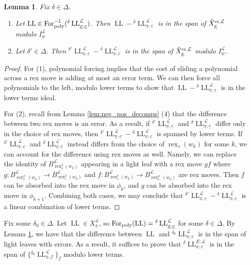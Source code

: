 \documentclass{amsart}
\newcommand{\scrL}{\mathcal{L}}
\DeclareMathOperator{\For}{For}
\DeclareMathOperator{\rex}{rex}
\DeclareMathOperator{\LL}{LL}
\newcommand{\ue}{\underline{e}}
\newcommand{\uf}{\underline{f}}
\newcommand{\uw}{\underline{w}}
\newcommand{\ux}{\underline{x}}
\newtheorem{lemma}[subsubsection]{Lemma}
\theoremstyle{definition}
\numberwithin{equation}{subsection}
\begin{document}
\begin{lemma}\label{lem:sliding_and_ll_with_errors}
    Fix $\delta \in \Delta$.
    \begin{enumerate}
        \item Let $\LL \in \For_{\textnormal{poly}}^{-1} ({}^{\delta} \LL_{\ux, \ue}^{\scrL})$. Then $\LL - {}^{\delta} \LL_{\ux, \ue}^{\scrL}$ is in the span of $\hat{X}_{\ux}^{\textnormal{er}, \scrL}$ modulo $I_{\uw}^{\scrL}$
        \item Let $\delta' \in \Delta$. Then ${}^{\delta'} \LL_{\ux, \ue}^{\scrL} - {}^{\delta} \LL_{\ux, \ue}^{\scrL}$ is in the span of $\hat{X}_{\ux}^{\textnormal{er}, \scrL}$ modulo $I_{\uw}^{\scrL}$.
    \end{enumerate}
\end{lemma}
\begin{proof}
    For (1), polynomial forcing implies that the cost of sliding a polynomial across a rex move is adding at most an error term.
    We can then force all polynomials to the left, modulo lower terms to show that $\LL - {}^{\delta} \LL_{\ux, \ue}^{\scrL}$ is in the lower terms ideal.

    For (2), recall from Lemma \ref{lem:neg_pos_decomps} (4) that the difference between two rex moves is an error.
    As a result, if ${}^{\delta'} \LL_{\ux, \ue}^{\scrL}$ and ${}^{\delta} \LL_{\ux, \ue}^{\scrL}$ differ only in the choice of rex moves, then ${}^{\delta'} \LL_{\ux, \ue}^{\scrL} - {}^{\delta} \LL_{\ux, \ue}^{\scrL}$ is spanned by lower terms.
    If  ${}^{\delta'} \LL_{\ux, \ue}^{\scrL}$ and ${}^{\delta} \LL_{\ux, \ue}^{\scrL}$ instead differs from the choice of $\rex_s (w_k)$ for some $k$, we can account for the difference using rex moves as well.
    Namely, we can replace the identity of $B_{\rex_s^{\delta} (w_k)}^{\scrL}$ appearing in a light leaf with a rex move $gf$ where $g : B_{\rex_s^{\delta'} (w_k)}^{\scrL} \to B_{\rex_s^{\delta} (w_k)}^{\scrL}$ and $f : B_{\rex_s^{\delta} (w_k)}^{\scrL} \to B_{\rex_s^{\delta'} (w_k)}^{\scrL}$ are rex moves.
    Then $f$ can be absorbed into the rex move in $\phi_k$, and $g$ can be absorbed into the rex move in $\phi_{k+1}$.
    Combining both cases, we may conclude that ${}^{\delta'} \LL_{\ux, \ue}^{\scrL} - {}^{\delta} \LL_{\ux, \ue}^{\scrL}$ is a linear combination of lower terms.
\end{proof}

Fix some $\delta_0 \in \Delta$.
Let $\LL \in X_{\ux}^{\scrL}$, so $\For_{\textnormal{poly}} (\LL) = {}^{\delta} \LL_{\ux, \ue}^{\scrL}$ for some $\delta \in \Delta$.
By Lemma \ref{lem:sliding_and_ll_with_errors}, we have that the difference between $\LL$ and ${}^{\delta_0} \LL_{\ux, \ue}^{\scrL}$ is in the span of light leaves with errors.
As a result, it suffices to prove that ${}^{\delta} \LL_{\ux, \ue}^{E, \scrL}$ is in the span of $\{ {}^{\delta_0} \LL_{\ux, \uf}^{\scrL} \}_{\uf}$ modulo lower terms.
\end{document}
